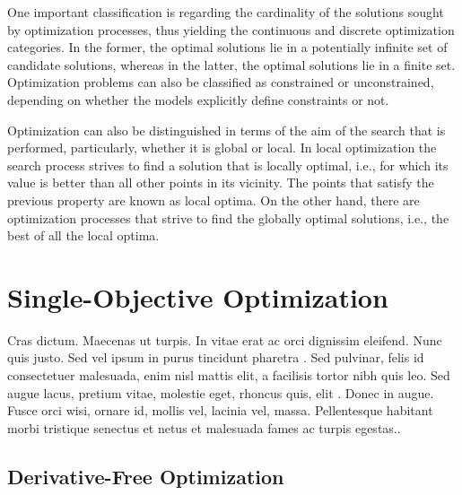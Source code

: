 \cleardoublepage
\label{chap:back}




One important classification is regarding the cardinality of the solutions sought by optimization processes, thus yielding the continuous and discrete optimization categories. In the former, the optimal solutions lie in a potentially infinite set of candidate solutions, whereas in the latter, the optimal solutions lie in a finite set. Optimization problems can also be classified as constrained or unconstrained, depending on whether the models explicitly define constraints or not.

Optimization can also be distinguished in terms of the aim of the search that is performed, particularly, whether it is global or local. In local optimization the search process strives to find a solution that is locally optimal, i.e., for which its value is better than all other points in its vicinity. The points that satisfy the previous property are known as local optima. On the other hand, there are optimization processes that strive to find the globally optimal solutions, i.e., the best of all the local optima. 

\section{Single-Objective Optimization}
Cras dictum. Maecenas ut turpis. In vitae erat ac orci dignissim eleifend. Nunc quis justo. Sed vel ipsum in purus tincidunt pharetra \cite{MacAulay:2005fk}. Sed pulvinar, felis id consectetuer malesuada, enim nisl mattis elit, a facilisis tortor nibh quis leo. Sed augue lacus, pretium vitae, molestie eget, rhoncus quis, elit \cite{Schwarz:2007lr}. Donec in augue. Fusce orci wisi, ornare id, mollis vel, lacinia vel, massa. Pellentesque habitant morbi tristique senectus et netus et malesuada fames ac turpis egestas..

\subsection{Derivative-Free Optimization}

